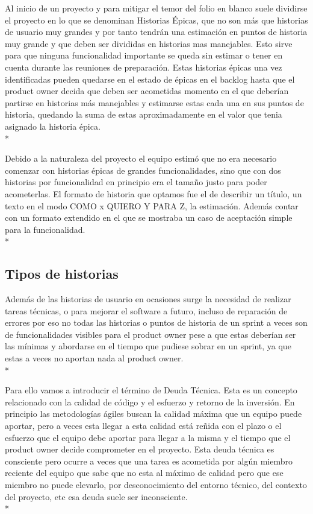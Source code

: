 \documentclass[../pfc.tex]{subfiles}
\begin{document}
	Al inicio de un proyecto y para mitigar el temor del folio en blanco suele dividirse el proyecto en lo que se denominan Historias Épicas, que no son más que historias de usuario muy grandes y por tanto tendrán una estimación en puntos de historia muy grande y que deben ser divididas en historias mas manejables. Esto sirve para que ninguna funcionalidad importante se queda sin estimar o tener en cuenta durante las reuniones de preparación. Estas historias épicas una vez identificadas pueden quedarse en el estado de épicas en el backlog hasta que el product owner decida que deben ser acometidas momento en el que deberían partirse en historias más manejables y estimarse estas cada una en sus puntos de historia, quedando la suma de estas aproximadamente en el valor que tenia asignado la historia épica.\\*
	
	Debido a la naturaleza del proyecto el equipo estimó que no era necesario comenzar con historias épicas de grandes funcionalidades, sino que con dos historias por funcionalidad en principio era el tamaño justo para poder acometerlas. El formato de historia que optamos fue el de describir un título, un texto en el modo COMO x QUIERO Y PARA Z, la estimación. Además contar con un formato extendido en el que se mostraba un caso de aceptación simple para la funcionalidad.\\*
	
	\subsection{Tipos de historias}
	
	Además de las historias de usuario en ocasiones surge la necesidad de realizar tareas técnicas, o para mejorar el software a futuro, incluso de reparación de errores por eso no todas las historias o puntos de historia de un sprint a veces son de funcionalidades visibles para el product owner pese a que estas deberían ser las mínimas y abordarse en el tiempo que pudiese sobrar en un sprint, ya que estas a veces no aportan nada al product owner.\\*
	
	Para ello vamos a introducir el término de Deuda Técnica. Esta es un concepto relacionado con la calidad de código y el esfuerzo y retorno de la inversión. En principio las metodologías ágiles buscan la calidad máxima que un equipo puede aportar, pero a veces esta llegar a esta calidad está reñida con el plazo o el esfuerzo que el equipo debe aportar para llegar a la misma y el tiempo que el product owner decide comprometer en el proyecto. Esta deuda técnica es consciente pero ocurre a veces que una tarea es acometida por algún miembro reciente del equipo que sabe que no esta al máximo de calidad pero que ese miembro no puede elevarlo, por desconocimiento del entorno técnico, del contexto del proyecto, etc esa deuda suele ser inconsciente.\\*
	
\end{document}
